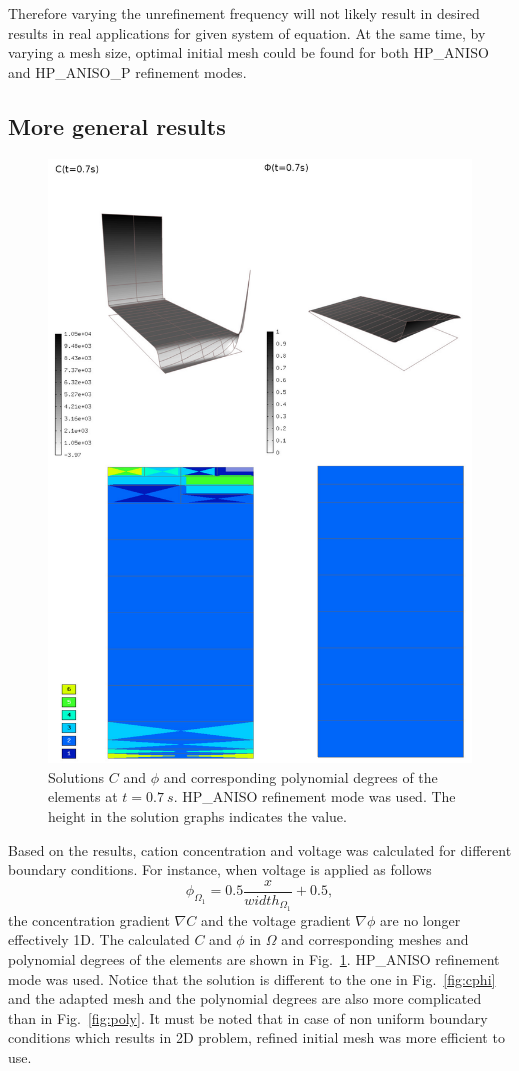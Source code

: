 Therefore varying the unrefinement frequency will
not likely result in desired results in real applications for given system of equation.
At the same time, by varying a mesh size, optimal initial mesh could be found
for both HP\_ANISO and HP\_ANISO\_P refinement modes.
	 
\subsection{More general results}
\begin{figure}[!ht]
  \begin{centering}
  \includegraphics[width=.75\columnwidth]{cphiorders}
  \caption{\label{fig:cphi-orders} Solutions $C$ and $\phi$
  and corresponding polynomial degrees of the elements at
  $t=0.7\ s$. HP\_ANISO refinement mode was used. The height
  in the solution graphs indicates the value.}
  \end{centering}
\end{figure}

Based on the results, cation concentration and voltage was calculated
for different boundary conditions.
For instance, when voltage is applied as follows
\begin{equation}
  \phi_{\Omega_1}=0.5\frac{x}{width_{\Omega_1}}+0.5,
\end{equation}
the concentration gradient $\nabla C$ and the voltage gradient $\nabla \phi$ are no
longer effectively 1D.
The calculated $C$ and $\phi$ in $\Omega$ and corresponding meshes and polynomial
degrees of the elements are shown in Fig.~\ref{fig:cphi-orders}.
HP\_ANISO refinement mode was used. Notice that the solution
is different to the one in Fig.~\ref{fig:cphi} and the adapted mesh and the
polynomial degrees are also more complicated than in Fig.~\ref{fig:poly}.
It must be noted that in case of non uniform boundary conditions which
results in 2D problem, refined initial mesh was more efficient to use.
